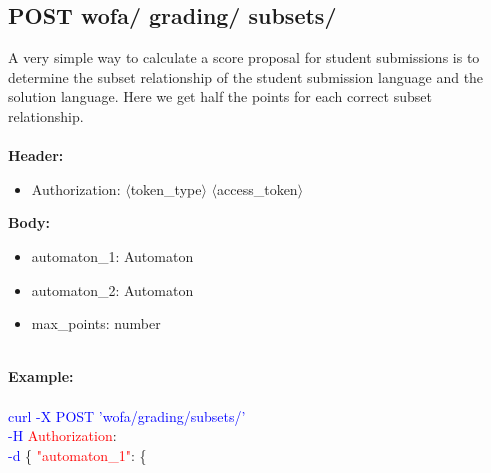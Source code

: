 \subsection{POST wofa/ grading/ subsets/}
A very simple way to calculate a score proposal for student submissions is to determine the subset relationship of the student submission language and the solution language. Here we get half the points for each correct subset relationship.  \\
\ \\
\textbf{Header:}
\begin{itemize}
    \item Authorization: $\langle$token\_type$\rangle$ $\langle$access\_token$\rangle$
\end{itemize}
\textbf{Body:}
\begin{itemize}
     \item automaton\_1: Automaton
    \item automaton\_2: Automaton
    \item max\_points: number
\end{itemize}
\ \\
\textbf{Example:} \\
\ \\
\textcolor{blue}{curl -X POST '\BaseURL wofa/grading/subsets/'\\
-H} \textcolor{red}{Authorization}: \Auth \\
\textcolor{blue}{-d} \{ 
\textcolor{red}{"automaton\_1"}: \{ 
